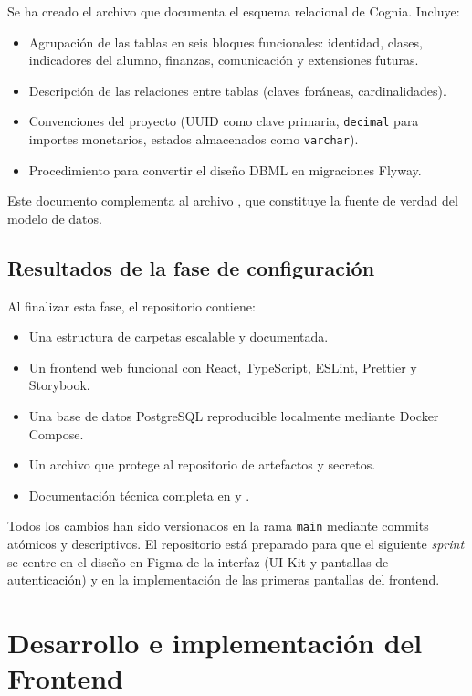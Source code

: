 \documentclass[12pt,a4paper]{report}
\begin{document}
Se ha creado el archivo  que documenta el esquema relacional de Cognia. Incluye:

\begin{itemize}
    \item Agrupación de las tablas en seis bloques funcionales: identidad, clases, indicadores del alumno, finanzas, comunicación y extensiones futuras.
    \item Descripción de las relaciones entre tablas (claves foráneas, cardinalidades).
    \item Convenciones del proyecto (UUID como clave primaria, \texttt{decimal} para importes monetarios, estados almacenados como \texttt{varchar}).
    \item Procedimiento para convertir el diseño DBML en migraciones Flyway.
\end{itemize}

Este documento complementa al archivo , que constituye la fuente de verdad del modelo de datos.

\section{Resultados de la fase de configuración}

Al finalizar esta fase, el repositorio contiene:

\begin{itemize}
    \item Una estructura de carpetas escalable y documentada.
    \item Un frontend web funcional con React, TypeScript, ESLint, Prettier y Storybook.
    \item Una base de datos PostgreSQL reproducible localmente mediante Docker Compose.
    \item Un archivo  que protege al repositorio de artefactos y secretos.
    \item Documentación técnica completa en  y .
\end{itemize}

Todos los cambios han sido versionados en la rama \texttt{main} mediante commits atómicos y descriptivos. El repositorio está preparado para que el siguiente \textit{sprint} se centre en el diseño en Figma de la interfaz (UI Kit y pantallas de autenticación) y en la implementación de las primeras pantallas del frontend.

\chapter{Desarrollo e implementación del Frontend}
\end{document}
